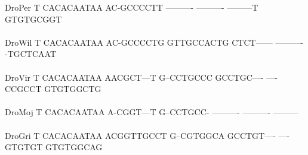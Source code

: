 \documentclass[11pt,twoside,reqno,a4paper]{article}
\begin{document}
{DroPer	T	CACACAATAA	AC-GCCCCTT	----------	----------	---------T	GTGTGCGGT\\
\hspace*{7\charwidth}\hspace*{1\charwidth}\hspace*{1\charwidth}\hspace*{1\charwidth}\hspace*{1\charwidth}\hspace*{1\charwidth}\hspace*{1\charwidth}\\
DroWil	T	CACACAATAA	AC-GCCCCTG	GTTGCCACTG	CTCT------	----------	-TGCTCAAT\\
\hspace*{7\charwidth}\hspace*{1\charwidth}\hspace*{1\charwidth}\hspace*{1\charwidth}\hspace*{1\charwidth}\hspace*{1\charwidth}\hspace*{1\charwidth}\\
DroVir	T	CACACAATAA	AACGCT---T	G--CCTGCCC	GCCTGC----	----CCGCCT	GTGTGGCTG\\
\hspace*{7\charwidth}\hspace*{1\charwidth}\hspace*{1\charwidth}\hspace*{1\charwidth}\hspace*{1\charwidth}\hspace*{1\charwidth}\hspace*{1\charwidth}\\
DroMoj	T	CACACAATAA	A-CGGT---T	G--CCTGCC-	----------	----------	---------\\
\hspace*{7\charwidth}\hspace*{1\charwidth}\hspace*{1\charwidth}\hspace*{1\charwidth}\hspace*{1\charwidth}\hspace*{1\charwidth}\hspace*{1\charwidth}\\
DroGri	T	CACACAATAA	ACGGTTGCCT	G--CGTGGCA	GCCTGT----	----GTGTGT	GTGTGGCAG\\
\hspace*{7\charwidth}\hspace*{1\charwidth}\hspace*{1\charwidth}\hspace*{1\charwidth}\hspace*{1\charwidth}\hspace*{1\charwidth}\hspace*{1\charwidth}\\
}
\end{document}
